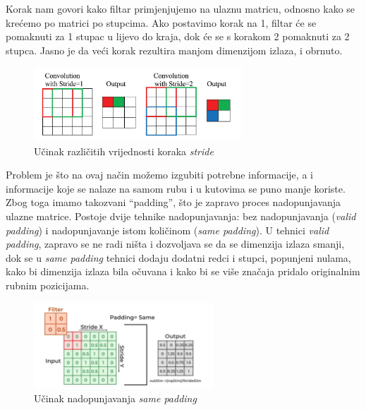 Korak nam govori kako filtar primjenjujemo na ulaznu matricu, odnosno kako se krećemo po matrici po stupcima.
Ako postavimo korak na 1, filtar će se pomaknuti za 1 stupac u lijevo do kraja, dok će se s korakom 2 pomaknuti za 2 stupca.
Jasno je da veći korak rezultira manjom dimenzijom izlaza, i obrnuto.
\FloatBarrier
\begin{figure}[h]
    \centering
    \includegraphics[width=0.7\textwidth]{images/Stride}
    \caption{Učinak različitih vrijednosti koraka \emph{stride}
    \protect\footnotemark}
    \label{fig:slika14}
\end{figure}
\FloatBarrier
{}


Problem je što na ovaj način možemo izgubiti potrebne informacije, a i informacije koje se nalaze na samom rubu i u kutovima se puno manje koriste.
Zbog toga imamo takozvani \enquote{padding}, što je zapravo proces nadopunjavanja ulazne matrice.
Postoje dvije tehnike nadopunjavanja: bez nadopunjavanja (\emph{valid padding}) i nadopunjavanje istom količinom (\emph{same padding}).
U tehnici \emph{valid padding}, zapravo se ne radi ništa i dozvoljava se da se dimenzija izlaza smanji, dok se u \emph{same padding} tehnici dodaju dodatni redci i stupci, popunjeni nulama, kako bi dimenzija izlaza bila očuvana i kako bi se više značaja pridalo originalnim rubnim pozicijama.

\FloatBarrier
\begin{figure}[h]
    \centering
    \includegraphics[width=0.6\textwidth]{images/Padding}
    \caption{Učinak nadopunjavanja \emph{same padding}
    \protect\footnotemark}
    \label{fig:slika15}
\end{figure}
\FloatBarrier
{}


